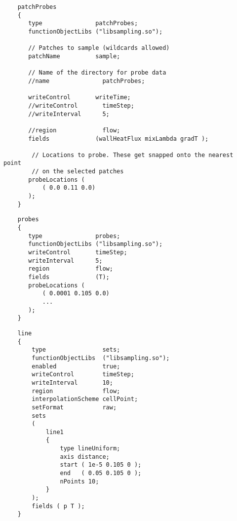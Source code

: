 \documentclass[a4paper, 12pt]{article}
\numberwithin{equation}{section}
\begin{document}
    \begin{minipage}{\textwidth}
    \vspace{12pt}
    {
    \begin{verbatim}
    patchProbes
    {
       type               patchProbes;
       functionObjectLibs ("libsampling.so");

       // Patches to sample (wildcards allowed)
       patchName          sample;

       // Name of the directory for probe data
       //name               patchProbes;

       writeControl       writeTime;
       //writeControl       timeStep;
       //writeInterval      5;

       //region             flow;
       fields             (wallHeatFlux mixLambda gradT );

        // Locations to probe. These get snapped onto the nearest point
        // on the selected patches
       probeLocations (
           ( 0.0 0.11 0.0)
       );
    }
    \end{verbatim}
    }
    \end{minipage}

    \begin{minipage}{\textwidth}
    \vspace{12pt}
    {
    \begin{verbatim}
    probes
    {
       type               probes;
       functionObjectLibs ("libsampling.so");
       writeControl       timeStep;
       writeInterval      5;
       region             flow;
       fields             (T);
       probeLocations (
           ( 0.0001 0.105 0.0)
           ...
       );
    }
    \end{verbatim}
    }
    \end{minipage}

    \begin{minipage}{\textwidth}
    \vspace{12pt}
    {
    \begin{verbatim}
    line
    {
        type                sets;
        functionObjectLibs  ("libsampling.so");
        enabled             true;
        writeControl        timeStep;
        writeInterval       10;
        region              flow;
        interpolationScheme cellPoint;
        setFormat           raw;
        sets
        (
            line1
            {
                type lineUniform;
                axis distance;
                start ( 1e-5 0.105 0 );
                end   ( 0.05 0.105 0 );
                nPoints 10;
            }
        );
        fields ( p T );
    }
    \end{verbatim}
    }
    \end{minipage}
\end{document}
